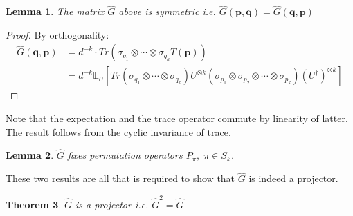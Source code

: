\documentclass[12pt]{amsart}
\newtheorem{theorem}{Theorem}[section]
\newtheorem{lemma}[theorem]{Lemma}
\theoremstyle{definition}
\theoremstyle{remark}
\numberwithin{equation}{section}
\theoremstyle{remark}
\begin{document}
\begin{lemma}
  The matrix $\widehat{G}$ above is symmetric i.e. $\widehat{G}(\textbf{p},\textbf{q}) = \widehat{G}(\textbf{q},\textbf{p})$
\end{lemma}
%
\begin{proof}
  By orthogonality:
  \begin{align}
    \widehat{G}(\textbf{q},\textbf{p})
    & = d^{-k} \cdot Tr(\sigma_{q_1} \otimes \cdots \otimes \sigma_{q_k} T(\textbf{p}) ) \\
    & = d^{-k} \mathbb{E}_{U}\left[ Tr(\sigma_{q_1} \otimes \cdots \otimes \sigma_{q_k}) U^{\otimes k} (\sigma_{p_1} \otimes \sigma_{p_2} \otimes \cdots \otimes \sigma_{p_k}) (U^\dagger)^{\otimes k}\right]
  \end{align}
\end{proof}
%
Note that the expectation and the trace operator commute by linearity of latter. The result follows from the cyclic invariance of trace.
%
\begin{lemma} \label{permfix}
$\widehat{G}$ fixes permutation operators $P_{\pi}, \; \pi \in S_k$.
\end{lemma}
%
These two results are all that is required to show that $\widehat{G}$ is indeed a projector.
%
\begin{theorem} \label{g-proj}
  $\widehat{G}$ is a projector i.e. $\widehat{G}^2 = \widehat{G}$
\end{theorem}
%
\end{document}
